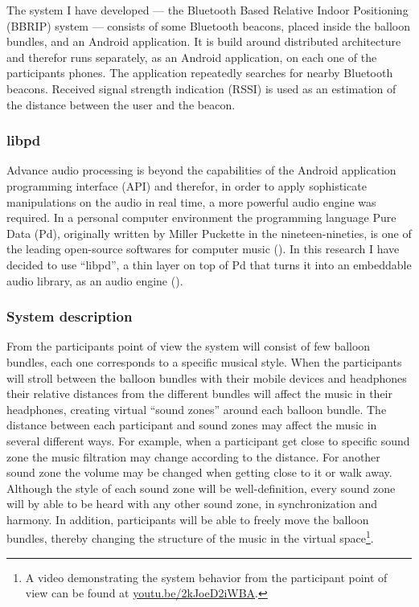 \documentclass[a4paper,11pt]{article}
\begin{document}
The system I have developed --- the Bluetooth Based Relative Indoor Positioning (BBRIP) system --- consists of some Bluetooth beacons, placed inside the balloon bundles, and an Android application.
It is build around distributed architecture and therefor runs separately, as an Android application, on each one of the participants phones.
The application repeatedly searches for nearby Bluetooth beacons.
Received signal strength indication (RSSI) is used as an estimation of the distance between the user and the beacon.

\subsubsection{libpd}\label{methods:libpd}

Advance audio processing is beyond the capabilities of the Android application programming interface (API) and therefor, in order to apply sophisticate manipulations on the audio in real time, a more powerful audio engine was required.
In a personal computer environment the programming language Pure Data (Pd), originally written by Miller Puckette in the nineteen-nineties, is one of the leading open-source softwares for computer music (\citeauthor{web:pd}).
In this research I have decided to use ``libpd'', a thin layer on top of Pd that turns it into an embeddable audio library, as an audio engine (\cite[p. v]{brinkmann12}).

\subsubsection{System description}\label{systemdescription}


From the participants point of view the system will consist of few balloon bundles, each one corresponds to a specific musical style.
When the participants will stroll between the balloon bundles with their mobile devices and headphones their relative distances from the different bundles will affect the music in their headphones, creating virtual ``sound zones'' around each balloon bundle.
The distance between each participant and sound zones may affect the music in several different ways.
For example, when a participant get close to specific sound zone the music filtration may change according to the distance.
For another sound zone the volume may be changed when getting close to it or walk away.
Although the style of each sound zone will be well-definition, every sound zone will by able to be heard with any other sound zone, in synchronization and harmony.
In addition, participants will be able to freely move the balloon bundles, thereby changing the structure of the music in the virtual space\footnote{A video demonstrating the system behavior from the participant point of view can be found at \href{http://youtu.be/2kJoeD2iWBA}{youtu.be/2kJoeD2iWBA}.}.
\end{document}
